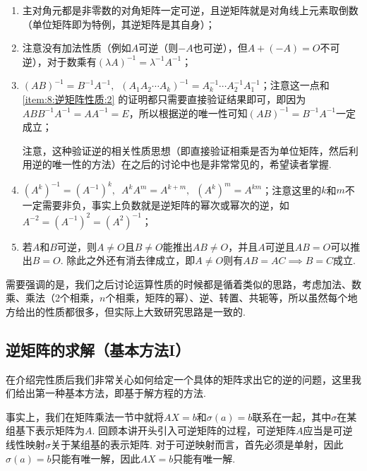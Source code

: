 \begin{enumerate}[label=(\arabic*)]
    \item 主对角元都是非零数的对角矩阵一定可逆，且逆矩阵就是对角线上元素取倒数（单位矩阵即为特例，其逆矩阵是其自身）；

    \item \label{item:8:逆矩阵性质:2}
          注意没有加法性质（例如$A$可逆（则$-A$也可逆），但$A+(-A)=O$不可逆），对于数乘有$(\lambda A)^{-1}=\lambda^{-1}A^{-1}$；

    \item \label{item:8:逆矩阵性质:3}
          $(AB)^{-1}=B^{-1}A^{-1},\enspace (A_1A_2\cdots A_k)^{-1}=A_k^{-1}\cdots A_2^{-1}A_1^{-1}$；注意这一点和 \ref*{item:8:逆矩阵性质:2} 的证明都只需要直接验证结果即可，即因为$ABB^{-1}A^{-1}=AA^{-1}=E$，所以根据逆的唯一性可知$(AB)^{-1}=B^{-1}A^{-1}$一定成立；

          注意，这种验证逆的相关性质思想（即直接验证相乘是否为单位矩阵，然后利用逆的唯一性的方法）在之后的讨论中也是非常常见的，希望读者掌握.

    \item $(A^k)^{-1}=(A^{-1})^k,\enspace A^kA^m=A^{k+m},\enspace (A^k)^m=A^{km}$；注意这里的$k$和$m$不一定需要非负，事实上负数就是逆矩阵的幂次或幂次的逆，如$A^{-2}=(A^{-1})^2=(A^2)^{-1}$；

    \item 若$A$和$B$可逆，则$A\neq O$且$B\neq O$能推出$AB\neq O$，并且$A$可逆且$AB=O$可以推出$B=O$. 除此之外还有消去律成立，即$A \neq O$则有$AB=AC \implies B=C$成立.
\end{enumerate}

需要强调的是，我们之后讨论运算性质的时候都是循着类似的思路，考虑加法、数乘、乘法（2个相乘，$n$个相乘，矩阵的幂）、逆、转置、共轭等，所以虽然每个地方给出的性质都很多，但实际上大致研究思路是一致的.

\subsection{逆矩阵的求解（基本方法I）}

在介绍完性质后我们非常关心如何给定一个具体的矩阵求出它的逆的问题，这里我们给出第一种基本方法，即基于解方程的方法.

事实上，我们在矩阵乘法一节中就将$AX=b$和$\sigma(a)=b$联系在一起，其中$\sigma$在某组基下表示矩阵为$A$. 回顾本讲开头引入可逆矩阵的过程，可逆矩阵$A$应当是可逆线性映射$\sigma$关于某组基的表示矩阵. 对于可逆映射而言，首先必须是单射，因此$\sigma(a)=b$只能有唯一解，因此$AX=b$只能有唯一解.

